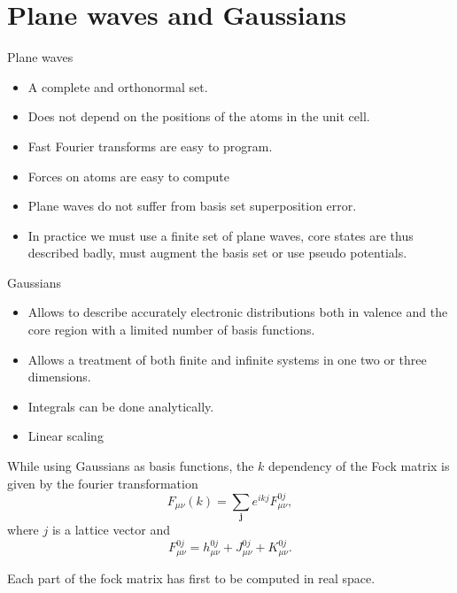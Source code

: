 \documentclass[12pt,a4paper,english]{beamer}
\newcommand{\mbf}{ \mathbf }
\begin{document}
\section{Plane waves and Gaussians}
\begin{frame}
  Plane waves
  \begin{itemize}
	\item A complete and orthonormal set.
	\item Does not depend on the positions of the atoms in the unit cell.
	\item Fast Fourier transforms are easy to program.
	\item Forces on atoms are easy to compute
	\item Plane waves do not suffer from basis set superposition error.
	\item In practice we must use a finite set of plane waves, core states are thus described badly, must augment the basis set or use pseudo potentials.
  \end{itemize}
\end{frame}
\begin{frame}
  Gaussians
  \begin{itemize}
	\item Allows to describe accurately electronic distributions both in valence and the core region with a limited number of basis functions.
	\item Allows a treatment of both finite and infinite systems in one two or three dimensions.
	\item Integrals can be done analytically.
	\item Linear scaling
  \end{itemize}
\end{frame}

\begin{frame}

  While using Gaussians as basis functions, the $k$ dependency of the Fock matrix is given by the fourier transformation
  \begin{equation}
	F_{\mu\nu}(k)=\sum_{\mbf j}e^{ikj}F_{\mu\nu}^{0j},
	   \label{hfbleq:totmatx2}
	 \end{equation}
	 where $j$ is a lattice vector and
	 \begin{equation}
	   F_{\mu\nu}^{0j}=h_{\mu\nu}^{0j}+J_{\mu\nu}^{0j}+K_{\mu\nu}^{0j}.
	 \end{equation}

	 Each part of the fock matrix has first to be computed in real space.

\end{frame}
\end{document}
